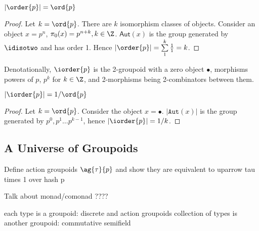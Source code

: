 \begin{lemma}
  $|\order{p}| = \ord{p}$
\end{lemma}

\begin{proof}
  Let $k = \ord{p}$. There are $k$ isomorphism classes of
  objects. Consider an object $x = p^n$,
  $\pi_0(x) = p^{n + k}, k \in \Z$. $\textsf{Aut}(x)$ is the group
  generated by $\idisotwo$ and has order 1. Hence
  $|\order{p}| = \sum\limits_{1}^{k}\frac{1}{1} = k$.
\end{proof}

\begin{definition}[$\iorder{p}$]
  Denotationally, $\iorder{p}$ is the 2-groupoid with a zero object
  $\bullet$, morphisms powers of $p$, $p^k$ for $k \in \Z$, and
  2-morphisms being 2-combinators between them.
\end{definition}

\begin{lemma}
  $|\iorder{p}| = 1/\ord{p}$
\end{lemma}

\begin{proof}
  Let $k = \ord{p}$. Consider the object $x =
  \bullet$. $|\texttt{Aut}(x)|$ is the group generated by
  $p^0, p^1 \dots p^{k-1}$, hence $|\iorder{p}| = 1/k$.
\end{proof}


\subsection{A Universe of Groupoids}

Define action groupoids $\ag{\tau}{p}$ and show they are equivalent to
uparrow tau times 1 over hash p

Talk about monad/comonad ????

each type is a groupoid: discrete and action groupoids
collection of types is another groupoid: commutative semifield





